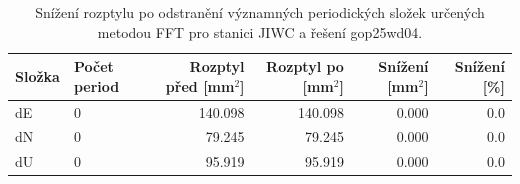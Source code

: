 \begin{table}[htbp]
\caption{Snížení rozptylu po odstranění významných periodických složek určených metodou FFT pro stanici JIWC a řešení gop25wd04.}
\label{tab:gop25wd04_stcd_jiwc_detr_weighted_1seg_spectral_fft_variance_reduction}
\begin{tabular}{llrrrr}
\toprule
Složka & Počet period & Rozptyl před [mm$^2$] & Rozptyl po [mm$^2$] & Snížení [mm$^2$] & Snížení [\%] \\
\midrule
dE & 0 & 140.098 & 140.098 & 0.000 & 0.0 \\
dN & 0 & 79.245 & 79.245 & 0.000 & 0.0 \\
dU & 0 & 95.919 & 95.919 & 0.000 & 0.0 \\
\bottomrule
\end{tabular}
\end{table}
